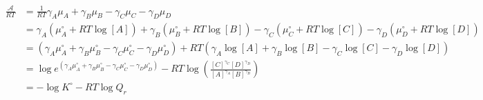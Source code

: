 \begin{eqnarray}\label{eqn:reaction-affinity-chemical-potential}
\frac{\mathcal{A}}{RT} & =\frac{1}{RT}{{\gamma }_{A}}{{\mu }_{A}}+{{\gamma }_{B}}{{\mu }_{B}}-{{\gamma }_{C}}{{\mu }_{C}}-{{\gamma }_{D}}{{\mu }_{D}} \\
& = {{\gamma }_{A}}(\mu_A^\circ + RT\log [A])+{{\gamma }_{B}}(\mu_B^\circ + RT\log [B])-{{\gamma }_{C}}(\mu_C^\circ + RT\log [C])-{{\gamma }_{D}}(\mu_D^\circ + RT\log [D]) \\
& = (\gamma_A\mu_A^\circ + \gamma_B\mu_B^\circ -\gamma_C\mu_C^\circ -\gamma_D\mu_D^\circ) + RT\left(\gamma_A\log [A] + \gamma_B\log [B] - \gamma_C\log [C] - \gamma_D\log [D]\right) \\
& = \log e^{(\gamma_A\mu_A^\circ + \gamma_B\mu_B^\circ -\gamma_C\mu_C^\circ -\gamma_D\mu_D^\circ)} - RT\log\left( \frac{[C]^{\gamma_C}[D]^{\gamma_D}}{[A]^{\gamma_A}[B]^{\gamma_B}}\right) \\
& = -\log K^\circ - RT\log Q_r \\
\end{eqnarray}